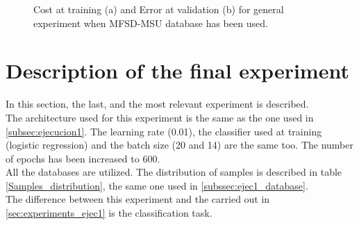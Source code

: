 \begin{figure}[H]
\centering
{}
\caption{Cost at training (a) and Error at validation (b) for general experiment when MFSD-MSU database has been used.}
 \label{fig:mfsd-ejec1}
\end{figure}

\section{Description of the final experiment}\label{sec:Final_archi} %
In this section, the last, and the most relevant experiment is described.\\

The architecture used for this experiment is the same as the one used in \ref{subsec:ejecucion1}. The learning rate (0.01), the classifier used at training (logistic regression) and the batch size (20 and 14) are the same too. The number of epochs has been increased to 600.\\

All the databases are utilized. The distribution of samples  is described in table \ref{Samples_distribution}, the same one used in \ref{subssec:ejec1_database}.\\

The difference between this experiment and the carried out in \ref{sec:experiments_ejec1} is the classification task.\\

